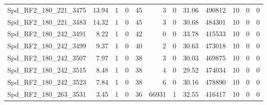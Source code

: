 \begin{longtable}[c]{@{}lrrrrrrrrrrr@{}}
Spd\_RF2\_180\_221\_3475      & 13.94                  & 1                       & 0                       & 45                     & 3                       & 0                       & 31.06                   & 490812                   & 10                       & 0                        & 0                        \\
Spd\_RF2\_180\_221\_3483      & 14.32                  & 1                       & 0                       & 45                     & 3                       & 0                       & 30.68                   & 484301                   & 10                       & 0                        & 0                        \\
Spd\_RF2\_180\_242\_3491      & 8.22                   & 1                       & 0                       & 42                     & 0                       & 0                       & 33.78                   & 415533                   & 10                       & 0                        & 0                        \\
Spd\_RF2\_180\_242\_3499      & 9.37                   & 1                       & 0                       & 40                     & 2                       & 0                       & 30.63                   & 473018                   & 10                       & 0                        & 0                        \\
Spd\_RF2\_180\_242\_3507      & 7.97                   & 1                       & 0                       & 38                     & 3                       & 0                       & 30.03                   & 469875                   & 10                       & 0                        & 0                        \\
Spd\_RF2\_180\_242\_3515      & 8.48                   & 1                       & 0                       & 38                     & 4                       & 0                       & 29.52                   & 474034                   & 10                       & 0                        & 0                        \\
Spd\_RF2\_180\_242\_3523      & 7.84                   & 1                       & 0                       & 38                     & 6                       & 0                       & 30.16                   & 478890                   & 10                       & 0                        & 0                        \\
Spd\_RF2\_180\_263\_3531      & 3.45                   & 1                       & 0                       & 36                     & 66931                   & 1                       & 32.55                   & 416417                   & 10                       & 0                        & 0                        \\

\end{longtable}
